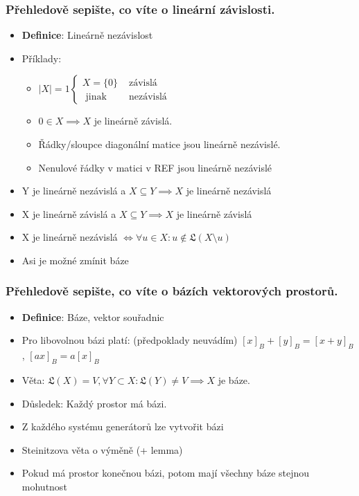 \documentclass[10pt,a4paper]{article}
\begin{document}
{\subsubsection{Přehledově sepište, co víte o lineární závislosti.}

\begin{itemize}[label=$\circ$]
    \item \textbf{Definice}: Lineárně nezávislost
\item Příklady: \begin{itemize}
\item $|X| = 1 \begin{cases} X = \{0\} & \text{ závislá} \\ \text{ jinak} & \text{ nezávislá} \end{cases}$  
\item $0 \in X \implies X$ je lineárně závislá.
\item Řádky/sloupce diagonální matice jsou lineárně nezávislé.
\item Nenulové řádky v matici v REF jsou lineárně nezávislé
\end{itemize}
\item Y je lineárně nezávislá a $X \subseteq Y \implies X$ je lineárně nezávislá
\item X je lineárně závislá a $X \subseteq Y \implies X$ je lineárně závislá
\item  X je lineárně nezávislá $\iff \forall u \in X: u \notin \mathfrak{L}(X\setminus u)$
\item Asi je možné zmínit báze
\end{itemize}


\subsubsection{Přehledově sepište, co víte o bázích vektorových prostorů.}

\begin{itemize}[label=$\circ$]
    \item \textbf{Definice}: Báze, vektor souřadnic
\item Pro libovolnou bázi platí: (předpoklady neuvádím) $[x]_B + [y]_B = [x+y]_B$, $[a x]_B = a [x]_B$
\item Věta: $\mathfrak{L}(X) = V, \forall Y \subset X: \mathfrak{L}(Y) \neq V \implies X$ je báze.
\item Důsledek: Každý prostor má bázi.
\item Z každého systému generátorů lze vytvořit bázi
\item Steinitzova věta o výměně (+ lemma)
\item Pokud má prostor konečnou bázi, potom mají všechny báze stejnou mohutnost



\end{itemize}}
\end{document}
